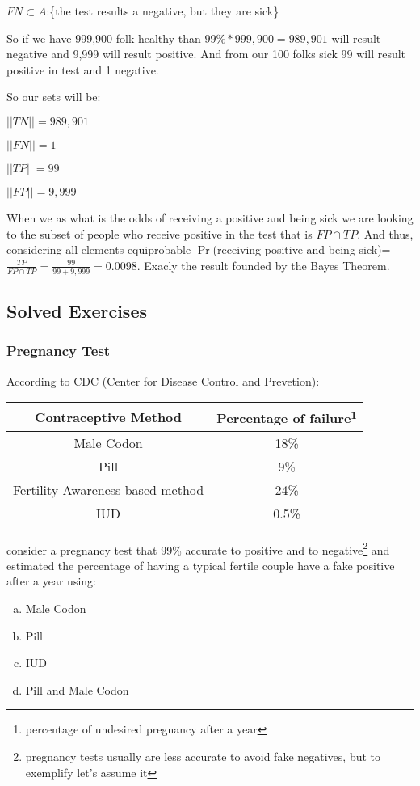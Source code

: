 \documentclass{book}
\begin{document}
$FN \subset A$:\{the test results a negative, but they are sick\}

So if we have 999,900 folk healthy than $99\%*999,900 = 989,901$ will result negative and 9,999 will result positive. And from our 100 folks sick 99 will result positive in test and 1 negative.

So our sets will be:

$||TN|| = 989,901$

$||FN|| = 1$

$||TP|| = 99$

$||FP|| = 9,999$

When we as what is the odds of receiving a positive and being sick we are looking to the subset of people who receive positive in the test that is $FP \cap TP$. And thus, considering all elements equiprobable $\Pr$(receiving positive and being sick)=$\frac{TP}{FP \cap TP} = \frac{99}{99+9,999}=0.0098$. Exacly the result founded by the Bayes Theorem.


\subsection{Solved Exercises}



\subsubsection{Pregnancy Test}

    According to CDC (Center for Disease Control and Prevetion):
    

    \begin{center}
     \begin{tabular}{||c | c||} 
     \hline
     Contraceptive Method & Percentage of failure\footnote{percentage of undesired pregnancy after a year} \\ [0.9ex] 
     \hline\hline
     Male Codon & 18\% \\ 
    \hline
    Pill & 9\% \\ 
    \hline
    Fertility-Awareness based method & 24\% \\ 
    \hline
    IUD & 0.5\% \\
    \hline
    \end{tabular}
    \end{center}
    consider a pregnancy test that 99\% accurate to positive and to negative\footnote{pregnancy tests usually are less accurate to avoid fake negatives, but to exemplify let's assume it}  and estimated the percentage of having a typical fertile couple have a fake positive after a year using:
    \begin{enumerate}[(a)]
        \item Male Codon
        \item Pill
        \item IUD
        \item Pill and Male Codon
    \end{enumerate}
    
\end{document}
